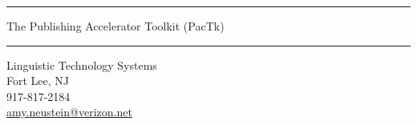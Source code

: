 \documentclass[11pt]{article}
\newcommand{\cyanhr}{{\textcolor{cyann!40}{\hrule}}}
\begin{document}


\thispagestyle{empty}

\vspace*{-56pt}


\begin{center}

{\cyanhr}

\vspace*{15pt}

{\color{red!70!black}\selectfont





{\large{The Publishing Accelerator Toolkit (PacTk)}}





}

{\cyanhr}

\vspace*{15pt}

\hspace{-32pt}Linguistic Technology Systems\\
\hspace{-32pt}Fort Lee, NJ\\
\hspace{-32pt}917-817-2184\\
\hspace{-32pt}\href{mailto://amy.neustein@verizon.net}{amy.neustein@verizon.net}

\end{center}







\vspace*{1pt}
\end{document}
